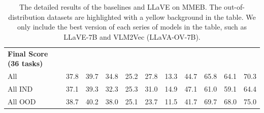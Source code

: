 \documentclass[11pt]{article}
\begin{document}
\begin{table}[]
{\begin{tabular}{lcccccccccc}
\rowcolor{cyan!15} \textbf{Final Score (36 tasks)} & & & & &  & & & & &\\
All                  & 37.8 & 39.7 & 34.8 & 25.2  & 27.8 & 13.3 & 44.7 & 65.8 & 64.1 & 70.3\\
All IND       & 37.1 & 39.3 & 32.3 & 25.3  & 31.0 & 14.9 & 47.1 & 61.0 & 59.1 & 64.4\\
All OOD       & 38.7 & 40.2 & 38.0 & 25.1  & 23.7 &  11.5 & 41.7 & 69.7 & 68.0 & 75.0\\

\bottomrule
\end{tabular}
}
\caption{The detailed results of the baselines and LLaVE on MMEB. The out-of-distribution datasets are highlighted with a yellow background in the table. We only include the best version of each series of models in the table, such as LLaVE-7B and VLM2Vec (LLaVA-OV-7B).}
\label{tab:appendix_result}
\end{table}
\end{document}
